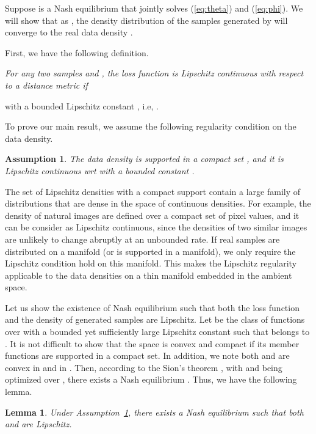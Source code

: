 \documentclass[11pt,fullpage, letterpaper,twoside]{article}
\newtheorem{lemma}{Lemma}
\newtheorem{assumption}{Assumption}
\newcommand{\1}[1]{\mathds{1}_{\left[#1\right]}}
\begin{document}
Suppose  is a Nash equilibrium that jointly solves  (\ref{eq:theta}) and (\ref{eq:phi}).  We will show that as , the density distribution  of the samples generated by  will converge to the real data density .



First, we have the following definition.

{ \em For any two samples  and , the loss function  is Lipschitz continuous with respect to a distance metric  if

with a bounded Lipschitz constant , i.e, .
}



To prove our main result, we assume the following regularity condition on the data density. \begin{assumption}\label{asp}
The data density  is supported in a compact set , and it is Lipschitz continuous wrt  with a bounded constant .
\end{assumption}



The set of Lipschitz densities with a compact support contain a large family of distributions that are dense in the space of continuous densities.
For example, the density of natural images are defined over a compact set of pixel values, and it can be consider as Lipschitz continuous, since the densities of two similar images are unlikely to change abruptly at an unbounded rate. If real samples are distributed on a manifold (or  is supported in a manifold), we only require the Lipschitz condition hold on this manifold.  This makes the Lipschitz regularity applicable to the data densities on a thin manifold embedded in the ambient space.


Let us show the existence of Nash equilibrium
such that both the loss function  and the density  of generated samples are Lipschitz. Let  be the class of functions over  with a bounded yet sufficiently large Lipschitz constant  such that  belongs to .
It is not difficult to show that the space  is convex and compact
if its member functions are supported in a compact set.
In addition, we note both  and  are convex in  and in .
Then, according to the Sion's theorem \cite{sion1958general}, with  and  being optimized over , there exists a Nash equilibrium .  Thus, we have the following lemma.





\begin{lemma}\label{lem2}
Under Assumption~\ref{asp}, there exists a Nash equilibrium  such that both  and  are Lipschitz.
\end{lemma}
\end{document}
